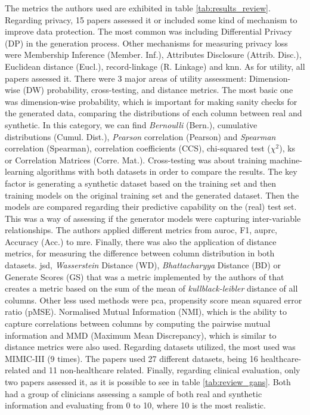 The metrics the authors used are exhibited in table \ref{tab:results_review}. Regarding privacy, 15 papers assessed it or included some kind of mechanism to improve data protection. The most common was including Differential Privacy (DP) in the generation process. Other mechanisms for measuring privacy loss were Membership Inference (Member. Inf.), Attributes Disclosure (Attrib. Disc.), Euclidean distance (Eucl.), record-linkage (R. Linkage) and \acf{knn}.
As for utility, all papers assessed it. There were 3 major areas of utility assessment: Dimension-wise (DW) probability, cross-testing, and distance metrics. The most basic one was dimension-wise probability, which is important for making sanity checks for the generated data, comparing the distributions of each column between real and synthetic. In this category, we can find \textit{Bernoulli} (Bern.), cumulative distributions (Cumul. Dist.), \textit{Pearson} correlation (Pearson) and \textit{Spearman} correlation (Spearman), correlation coefficients (CCS), chi-squared test ($\chi^{2}$),  \acf{ks} or Correlation Matrices (Corre. Mat.).
Cross-testing was about training machine-learning algorithms with both datasets in order to compare the results. The key factor is generating a synthetic dataset based on the training set and then training models on the original training set and the generated dataset. Then the models are compared regarding their predictive capability on the (real) test set. This was a way of assessing if the generator models were capturing inter-variable relationships. The authors applied different metrics from \acf{auroc}, F1, \ac{auprc}, Accuracy (Acc.) to \acf{mre}. Finally, there was also the application of distance metrics, for measuring the difference between column distribution in both datasets. \acf{jsd}, \textit{Wasserstein} Distance (WD), \textit{Bhattacharyya} Distance (BD) or Generate Scores (GS) that was a metric implemented by the authors of \cite{liu_ppgan_2019} that creates a metric based on the sum of the mean of \textit{kullblack-leibler}  distance of all columns. Other less used methods were \acf{pca}, propensity score mean squared error ratio (pMSE). Normalised Mutual Information (NMI), which is the ability to capture correlations between columns by computing the pairwise mutual information and MMD (Maximum Mean Discrepancy), which is similar to distance metrics were also used. Regarding datasets utilized, the most used was MIMIC-III \cite{mimiciii} (9 times). The papers used 27 different datasets, being 16 healthcare-related and 11 non-healthcare related. 
Finally, regarding clinical evaluation, only two papers assessed it, as it is possible to see in table \ref{tab:review_gans}. Both had a group of clinicians assessing a sample of both real and synthetic information and evaluating from 0 to 10, where 10 is the most realistic.
